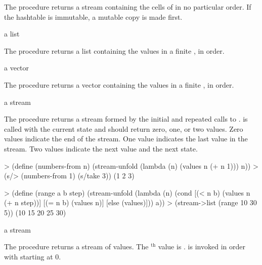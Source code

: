 The  procedure returns a stream containing the cells of
 in no particular order. If the hashtable is immutable, a mutable copy is
made first.

\begin{procedure}
\end{procedure}
\returns{} a list

The  procedure returns a list containing the values in a finite
, in order.

\begin{procedure}
\end{procedure}
\returns{} a vector

The  procedure returns a vector containing the values in a finite
, in order.

\begin{procedure}
\end{procedure}
\returns{} a stream

The  procedure returns a stream formed by the initial  and
repeated calls to .  is called with the current state and
should return zero, one, or two values. Zero values indicate the end of the stream. One
value indicates the last value in the stream. Two values indicate the next value and the
next state.

\codebegin
> (define (numbers-from n)
    (stream-unfold (lambda (n) (values n (+ n 1))) n))
> (s/> (numbers-from 1) (s/take 3))
(1 2 3)
\codeend

\codebegin
> (define (range a b step)
    (stream-unfold
     (lambda (n)
       (cond
        [(< n b) (values n (+ n step))]
        [(= n b) (values n)]
        [else (values)]))
     a))
> (stream->list (range 10 30 5))
(10 15 20 25 30)
\codeend

\begin{procedure}
\end{procedure}
\returns{} a stream

The  procedure returns a stream of  values. The
$^\textrm{th}$ value is .  is invoked in
order with  starting at 0.

